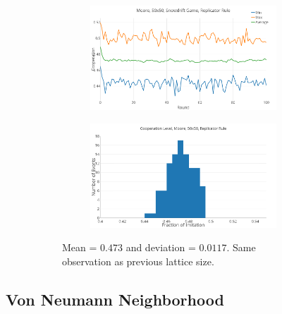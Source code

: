 \documentclass[a4paper, 11pt]{article}
\begin{document}
\begin{figure}[H]
\begin{subfigure}{.55\textwidth}
	\begin{subfigure}{1\textwidth}
		\includegraphics[width=1\linewidth]{SDMoore50x50}
	\end{subfigure}

	\begin{subfigure}{1\textwidth}
		\includegraphics[width=1\linewidth]{SDMoore50x50HG}
	\end{subfigure}
\end{subfigure}%
\begin{subfigure}{.45\textwidth}
	Mean = $0.473$ and deviation = $0.0117$. Same observation as previous lattice size.
\end{subfigure}

\end{figure}




\newpage

\subsection{Von Neumann Neighborhood}
\end{document}
